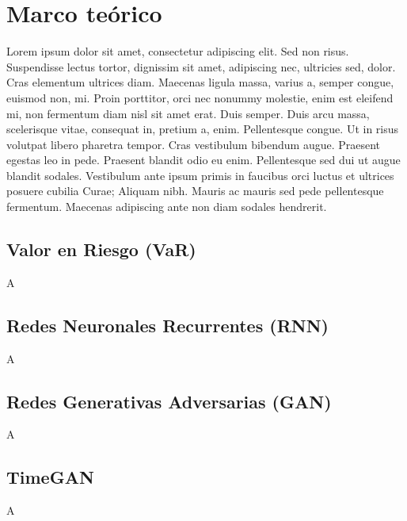 \documentclass{article}
\theoremstyle{definition}
\theoremstyle{remark}
\begin{document}
\section{Marco teórico}
Lorem ipsum dolor sit amet, consectetur adipiscing elit. Sed non risus. Suspendisse lectus tortor, dignissim sit amet, adipiscing nec, ultricies sed, dolor. Cras elementum ultrices diam. Maecenas ligula massa, varius a, semper congue, euismod non, mi. Proin porttitor, orci nec nonummy molestie, enim est eleifend mi, non fermentum diam nisl sit amet erat. Duis semper. Duis arcu massa, scelerisque vitae, consequat in, pretium a, enim. Pellentesque congue. Ut in risus volutpat libero pharetra tempor. Cras vestibulum bibendum augue. Praesent egestas leo in pede. Praesent blandit odio eu enim. Pellentesque sed dui ut augue blandit sodales. Vestibulum ante ipsum primis in faucibus orci luctus et ultrices posuere cubilia Curae; Aliquam nibh. Mauris ac mauris sed pede pellentesque fermentum. Maecenas adipiscing ante non diam sodales hendrerit.\\

\subsection{Valor en Riesgo (VaR)}
A

\subsection{Redes Neuronales Recurrentes (RNN)}
A

\subsection{Redes Generativas Adversarias (GAN)}
A

\subsection{TimeGAN}
A
\end{document}
